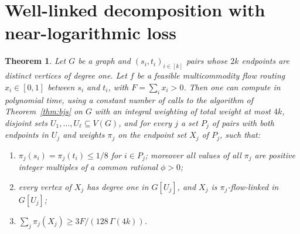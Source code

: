 \documentclass[11pt,letterpaper]{article}
\newtheorem{theorem}{Theorem}[section]
\theoremstyle{definition}
\begin{document}
\section{Well-linked decomposition with near-logarithmic loss}\label{sec:decomp}

\begin{theorem}\label{thm:decomp}
Let $G$ be a graph and $(s_i,t_i)_{i\in[k]}$ pairs whose $2k$ endpoints are distinct vertices
of degree one. Let $f$ be a feasible multicommodity flow routing $x_i\in[0,1]$ between $s_i$
and $t_i$, with $F=\sum_ix_i>0$. Then one can compute in polynomial time, using a constant
number of calls to the algorithm of Theorem~\ref{thm:bjs} on $G$ with an integral weighting of
total weight at most $4k$, disjoint sets $U_1,\dots,U_\ell\subseteq V(G)$, and for every $j$ a
set $P_j$ of pairs with both endpoints in $U_j$ and weights $\pi_j$ on the endpoint set $X_j$
of $P_j$, such that:
\begin{enumerate}[label=(\roman*),nosep]
\item $\pi_j(s_i)=\pi_j(t_i)\le1/8$ for $i\in P_j$; moreover all values of all $\pi_j$ are
positive integer multiples of a common rational $\phi>0$;
\item every vertex of $X_j$ has degree one in $G[U_j]$, and $X_j$ is $\pi_j$-flow-linked in
$G[U_j]$;
\item $\sum_j\pi_j(X_j)\ge 3F/(128\,\Gamma(4k))$.
\end{enumerate}
\end{theorem}
\end{document}
